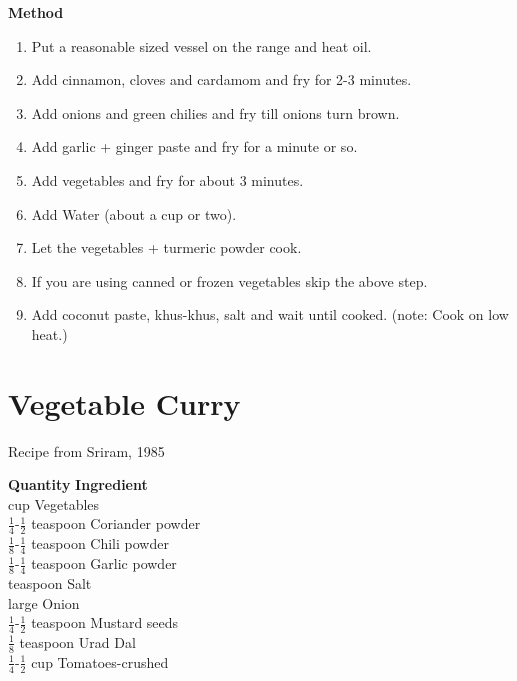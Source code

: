 {\bf Method}
\begin{enumerate}
   \item  Put a reasonable sized vessel on the range and heat oil.
   \item Add cinnamon, cloves and cardamom and fry for 2-3 minutes.
   \item Add onions and green chilies and fry till onions turn brown.
   \item Add garlic + ginger paste and fry for a minute or so.
   \item Add vegetables and fry for about 3 minutes.
   \item Add Water (about a cup or two).
   \item Let the vegetables + turmeric powder cook.
   \item If you are using canned or frozen vegetables skip the above step.
   \item Add coconut paste, khus-khus, salt and wait  until  cooked.    (note:
      Cook on low heat.)
\end{enumerate}

\section{Vegetable Curry}
  Recipe from Sriram, 1985

\begin{tabbing}
 \hspace{1.0cm} \={\bf Quantity}   \hspace{3.0cm} \={\bf Ingredient}\\
 cup   \>Vegetables \\
\>$\frac{1}{4}$-$\frac{1}{2}$ teaspoon   \>Coriander powder \\
\>$\frac{1}{8}$-$\frac{1}{4}$ teaspoon   \>Chili powder \\
\>$\frac{1}{8}$-$\frac{1}{4}$ teaspoon   \>Garlic powder \\
 teaspoon   \>Salt \\
   \> large Onion \\
\>$\frac{1}{4}$-$\frac{1}{2}$ teaspoon   \>Mustard seeds \\
\>$\frac{1}{8}$ teaspoon   \>Urad Dal \\
\>$\frac{1}{4}$-$\frac{1}{2}$ cup   \>Tomatoes-crushed \\
\end{tabbing}

